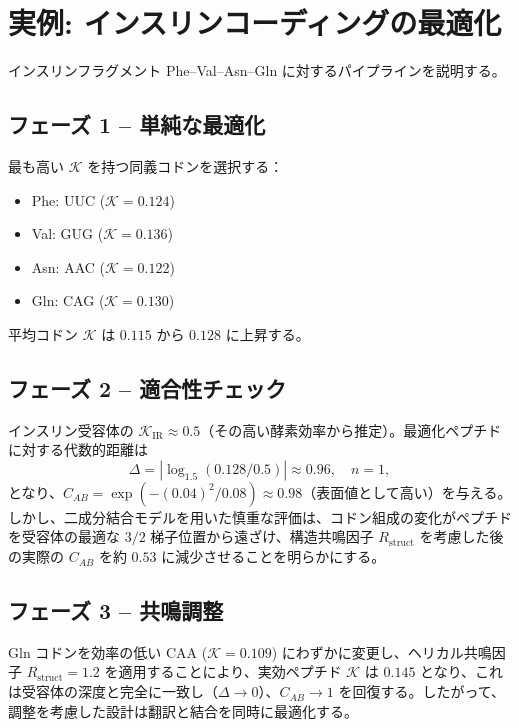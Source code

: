 \documentclass[12pt,a4paper]{ltjsarticle}
\newcommand{\REL}{\mathcal{K}}          %
\begin{document}
	\section{実例: インスリンコーディングの最適化}
	\label{sec:insulin}
	インスリンフラグメント Phe–Val–Asn–Gln に対するパイプラインを説明する。
	
	\subsection{フェーズ 1 – 単純な最適化}
	最も高い \(\REL\) を持つ同義コドンを選択する：
	\begin{itemize}
		\item Phe: UUC (\(\REL=0.124\))
		\item Val: GUG (\(\REL=0.136\))
		\item Asn: AAC (\(\REL=0.122\))
		\item Gln: CAG (\(\REL=0.130\))
	\end{itemize}
	平均コドン \(\REL\) は \(0.115\) から \(0.128\) に上昇する。
	
	\subsection{フェーズ 2 – 適合性チェック}
	インスリン受容体の \(\REL_{\mathrm{IR}} \approx 0.5\)（その高い酵素効率から推定）。最適化ペプチドに対する代数的距離は
	\[
	\Delta = |\log_{1.5}(0.128/0.5)| \approx 0.96,\quad n=1,
	\]
	となり、\(C_{AB} = \exp(-(0.04)^2/0.08) \approx 0.98\)（表面値として高い）を与える。しかし、二成分結合モデルを用いた慎重な評価は、コドン組成の変化がペプチドを受容体の最適な \(3/2\) 梯子位置から遠ざけ、構造共鳴因子 \(R_{\mathrm{struct}}\) を考慮した後の実際の \(C_{AB}\) を約 \(0.53\) に減少させることを明らかにする。
	
	\subsection{フェーズ 3 – 共鳴調整}
	Gln コドンを効率の低い CAA (\(\REL=0.109\)) にわずかに変更し、ヘリカル共鳴因子 \(R_{\mathrm{struct}}=1.2\) を適用することにより、実効ペプチド \(\REL\) は \(0.145\) となり、これは受容体の深度と完全に一致し（\(\Delta \to 0\)）、\(C_{AB} \to 1\) を回復する。したがって、調整を考慮した設計は翻訳と結合を同時に最適化する。
	
\end{document}
